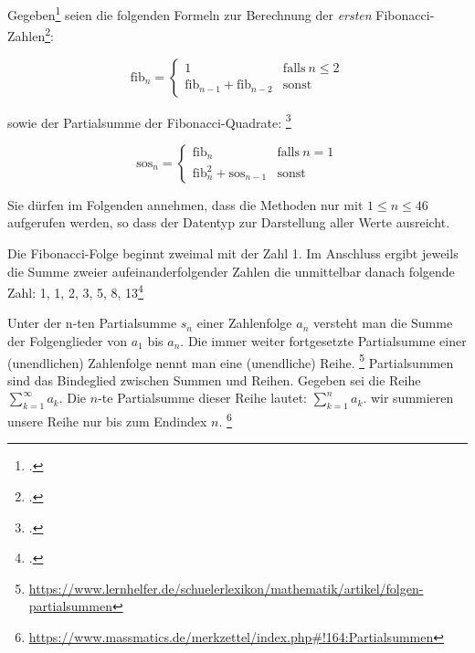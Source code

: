 \documentclass{bschlangaul-aufgabe}
\begin{document}

Gegeben\footcite[Thema 1 Aufgabe 3 Seite 5]{examen:66115:2017:03} seien
die folgenden Formeln zur Berechnung der \emph{ersten}
Fibonacci-Zahlen\footcite{wiki:fibonacci-folge}:

\begin{equation*}
\text{fib}_n =
\begin{cases}
1 & \text{falls}\ n \leq 2\\
\text{fib}_{n-1} + \text{fib}_{n-2} & \text{sonst}
\end{cases}
\end{equation*}

\noindent
sowie der Partialsumme der Fibonacci-Quadrate:
\footcite[Seite 1, Aufgabe 1]{aud:pu:3}

\begin{equation*}
\text{sos}_n =
\begin{cases}
\text{fib}_n & \text{falls}\ n = 1\\
\text{fib}_n^2 + \text{sos}_{n-1} & \text{sonst}
\end{cases}
\end{equation*}

\noindent
Sie dürfen im Folgenden annehmen, dass die Methoden nur mit $1 \leq n
\leq 46$ aufgerufen werden, so dass der Datentyp  zur
Darstellung aller Werte ausreicht.

\begin{bExkurs}
Die Fibonacci-Folge beginnt zweimal mit der Zahl 1. Im Anschluss ergibt
jeweils die Summe zweier aufeinanderfolgender Zahlen die unmittelbar
danach folgende Zahl: 1, 1, 2, 3, 5, 8,
13\footcite{wiki:fibonacci-folge}
\end{bExkurs}

\begin{bExkurs}[Partialsumme]
Unter der n-ten Partialsumme $s_n$ einer Zahlenfolge $a_n$ versteht man
die Summe der Folgenglieder von $a_1$ bis $a_n$. Die immer
weiter fortgesetzte Partialsumme einer (unendlichen) Zahlenfolge nennt
man eine (unendliche) Reihe.
\footnote{\url{https://www.lernhelfer.de/schuelerlexikon/mathematik/artikel/folgen-partialsummen}}
Partialsummen sind das Bindeglied zwischen Summen und Reihen.
Gegeben sei die Reihe $\sum_{k = 1}^{\infty} a_k$.
Die $n$-te Partialsumme dieser Reihe lautet: $\sum_{k = 1}^{n} a_k$.
\dh wir summieren unsere Reihe nur bis zum Endindex $n$.
\footnote{\url{https://www.massmatics.de/merkzettel/index.php\#!164:Partialsummen}}
\end{bExkurs}
\end{document}
